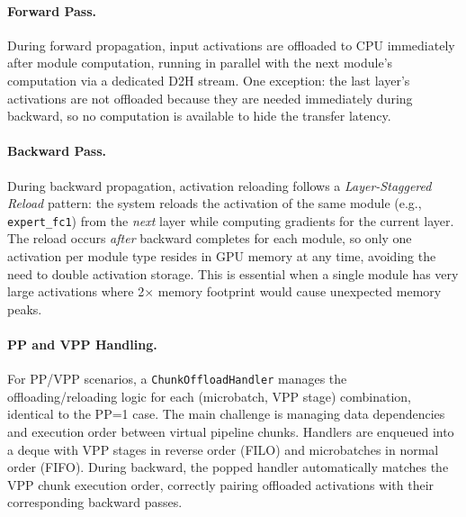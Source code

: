 \documentclass[10pt,logo,copyright]{nvidiatechreport}
\begin{document}
\paragraph{Forward Pass.}
During forward propagation, input activations are offloaded to CPU immediately after module computation, running in parallel with the next module's computation via a dedicated D2H stream. One exception: the last layer's activations are not offloaded because they are needed immediately during backward, so no computation is available to hide the transfer latency.

\paragraph{Backward Pass.}
During backward propagation, activation reloading follows a \textit{Layer-Staggered Reload} pattern: the system reloads the activation of the same module (e.g., \texttt{expert\_fc1}) from the \textit{next} layer while computing gradients for the current layer. The reload occurs \textit{after} backward completes for each module, so only one activation per module type resides in GPU memory at any time, avoiding the need to double activation storage. This is essential when a single module has very large activations where 2$\times$ memory footprint would cause unexpected memory peaks.

\paragraph{PP and VPP Handling.}
For PP/VPP scenarios, a \texttt{Chunk\-Offload\-Handler} manages the offloading/reloading logic for each (microbatch, VPP stage) combination, identical to the PP=1 case. The main challenge is managing data dependencies and execution order between virtual pipeline chunks. Handlers are enqueued into a deque with VPP stages in reverse order (FILO) and microbatches in normal order (FIFO). During backward, the popped handler automatically matches the VPP chunk execution order, correctly pairing offloaded activations with their corresponding backward passes.
\end{document}

